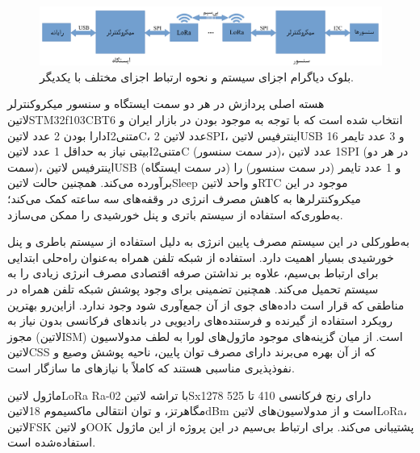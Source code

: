 \begin{figure}[!h]
	\centering
	\includegraphics[width=\linewidth]{Assets/system design.pdf}
	\caption{بلوک دیاگرام اجزای سیستم و نحوه ارتباط اجزای مختلف با یکدیگر.}
	\label{fig:systemDesign}
\end{figure}


هسته اصلی پردازش در هر دو سمت ایستگاه و سنسور میکروکنترلر ‌لاتین{STM32f103CBT6} انتخاب شده است که با توجه به موجود بودن در بازار ایران و دارا بودن 2 عدد ‌لاتین{I‌متنی{2}C}، 2 عدد ‌لاتین{SPI}، اینترفیس ‌لاتین{USB} و 3 عدد تایمر 16 بیتی نیاز به حداقل 1 عدد ‌لاتین{I‌متنی{2}C} (در سمت سنسور)، 1 عدد ‌لاتین{SPI} (در هر دو سمت)، اینترفیس ‌لاتین{USB} (در سمت ایستگاه)  و 1 عدد تایمر (در سمت سنسور) را برآورده می‌کند. همچنین حالت ‌لاتین{Sleep} و واحد ‌لاتین{RTC} موجود در این میکروکنترلرها به کاهش مصرف انرژی در وقفه‌های سه ساعته کمک می‌کند؛ به‌طوری‌که استفاده از سیستم باتری و پنل خورشیدی را ممکن می‌سازد.


به‌طورکلی در این سیستم مصرف پایین انرژی به دلیل استفاده از سیستم باطری و پنل خورشیدی بسیار اهمیت دارد. استفاده از شبکه تلفن همراه به‌عنوان راه‌حلی ابتدایی برای ارتباط بی‌سیم، علاوه بر نداشتن صرفه اقتصادی مصرف انرژی زیادی را به سیستم تحمیل می‌کند. همچنین تضمینی برای وجود پوشش شبکه تلفن همراه در مناطقی که قرار است داده‌های جوی از آن جمع‌آوری شود وجود ندارد. ازاین‌رو بهترین رویکرد استفاده از گیرنده و فرستنده‌های رادیویی در باندهای فرکانسی بدون نیاز به مجوز (‌لاتین{ISM}) است. از میان گزینه‌های موجود ماژول‌های لورا به لطف مدولاسیون ‌لاتین{CSS} که از آن بهره می‌برند دارای مصرف توان پایین، ناحیه پوشش وصیع و نفوذپذیری مناسبی هستند که کاملاً با نیازهای ما سازگار است.

ماژول ‌لاتین{LoRa Ra-02} با تراشه ‌لاتین{Sx1278} دارای رنج فرکانسی 410 تا 525 مگاهرتز، و توان انتقالی ماکسیموم 18‌لاتین{dBm} است و از مدولاسیون‌های ‌لاتین{LoRa}، ‌لاتین{FSK} و ‌لاتین{OOK} پشتیبانی می‌کند. برای ارتباط بی‌سیم در این پروژه از این ماژول استفاده‌شده است. 

